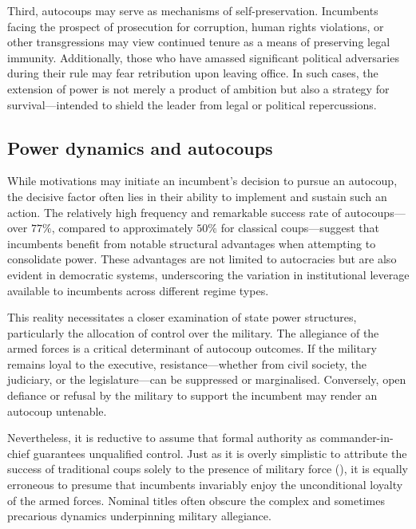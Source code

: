 \documentclass[
  12pt,
]{report}
\begin{document}
Third, autocoups may serve as mechanisms of self-preservation.
Incumbents facing the prospect of prosecution for corruption, human
rights violations, or other transgressions may view continued tenure as
a means of preserving legal immunity. Additionally, those who have
amassed significant political adversaries during their rule may fear
retribution upon leaving office. In such cases, the extension of power
is not merely a product of ambition but also a strategy for
survival---intended to shield the leader from legal or political
repercussions.

\subsection*{Power dynamics and
autocoups}\label{power-dynamics-and-autocoups}

While motivations may initiate an incumbent's decision to pursue an
autocoup, the decisive factor often lies in their ability to implement
and sustain such an action. The relatively high frequency and remarkable
success rate of autocoups---over \(77\%\), compared to approximately
\(50\%\) for classical coups---suggest that incumbents benefit from
notable structural advantages when attempting to consolidate power.
These advantages are not limited to autocracies but are also evident in
democratic systems, underscoring the variation in institutional leverage
available to incumbents across different regime types.

This reality necessitates a closer examination of state power
structures, particularly the allocation of control over the military.
The allegiance of the armed forces is a critical determinant of autocoup
outcomes. If the military remains loyal to the executive,
resistance---whether from civil society, the judiciary, or the
legislature---can be suppressed or marginalised. Conversely, open
defiance or refusal by the military to support the incumbent may render
an autocoup untenable.

Nevertheless, it is reductive to assume that formal authority as
commander-in-chief guarantees unqualified control. Just as it is overly
simplistic to attribute the success of traditional coups solely to the
presence of military force (), it is
equally erroneous to presume that incumbents invariably enjoy the
unconditional loyalty of the armed forces. Nominal titles often obscure
the complex and sometimes precarious dynamics underpinning military
allegiance.
\end{document}
